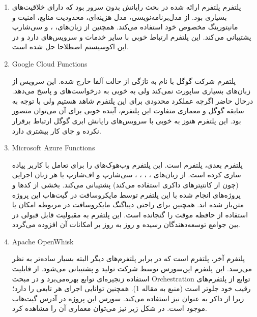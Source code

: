 \begin{enumerate}
	\item {}
	
پلتفرم  \cite{AWSLambda} پلتفرم ارائه شده در بحث رایانش بدون سرور بود که دارای خلاقیت‌های بسیاری بود. از مدل‌برنامه‌نویسی، مدل هزینه‌ای، محدودیت منابع، امنیت و مانیتورینگ مخصوص خود استفاده می‌کند. همچنین  از زبان‌های، ،  و سی‌شارپ پشتیبانی می‌کند. این پلتفرم ارتباط خوبی با سایر خدمات و سرویس‌های  دارد و در این اکوسیستم اصطلاحا حل شده است.

\item{Google Cloud Functions}

پلتفرم شرکت گوگل با نام  \cite{GoogleCloudFunctions}به تازگی از حالت آلفا خارج شده. این سرویس از زبان‌های بسیاری ساپورت نمی‌کند ولی به خوبی به درخواست‌های  و  پاسخ می‌دهد. درحال حاضر اگرچه عملکرد محدودی برای این پلتفرم شاهد هستیم ولی با توجه به سابقه گوگل و معماری متفاوت این پلتفرم، آینده خوبی برای آن می‌توان متصور بود. این پلتفرم هنوز به خوبی با سرویس‌های رایانش ابری گوگل ارتباط برقرار نکرده و جای کار بیشتری دارد. 

\item{Microsoft Azure Functions}

پلتفرم بعدی، پلتفرم   \cite{MicrosoftAzureFunctions}است. این پلتفرم وب‌هوک‌های  را برای تعامل با کاربر پیاده سازی کرده است. از زبان‌های ، ، ، ، سی‌شارپ و اف‌شارپ یا هر زبان اجرایی (چون از کانتیترهای داکری استفاده می‌کند) پشتیبانی می‌کند. بخشی از کد‌ها و پروژه‌های انجام شده با این پلتفرم توسط مایکروسافت در گیت‌هاب این پروژه متن‌باز شده اند. همچنین برای راحتی دیباگنگ مایکروسافت در  مربوطه امکان  یا استفاده از حافظه موقت را گنجانده است. این پلتفرم به مقبولیت قابل قبولی در بین جوامع توسعه‌دهندگان رسیده و روز به روز بر امکانات آن افزوده می‌گردد.  

\item{Apache OpenWhisk}

پلتفرم آخر، پلتفرم  \cite{ApacheOpenwhisk}است که در برابر پلتفرم‌های دیگر البته بسیار ساده‌تر به نظر می‌رسد. این پلتفرم اپن‌سورس توسط شرکت  تولید و پشتیبانی می‌شود. از قابلیت استفاده زنجیره‌ای توابع بهره‌می‌برد و در مبحث Orchestration توابع از پلتفرم‌های رقیب خود جلوتر است (منبع به مقاله 1). همچنین  توانایی اجرای هر تابعی را دارد؛ زیرا از داکر به عنوان  نیز استفاده می‌کند. سورس این پروژه در آدرس گیت‌هاب  موجود است. در شکل زیر نیز می‌توان معماری آن را مشاهده کرد.
\end{enumerate}

